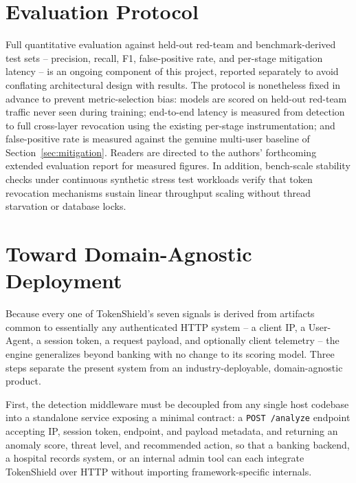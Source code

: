 \documentclass[conference]{IEEEtran}
\begin{document}
\section{Evaluation Protocol}
\label{sec:evaluation}
Full quantitative evaluation against held-out red-team and benchmark-derived test sets -- precision, recall, F1, false-positive rate, and per-stage mitigation latency -- is an ongoing component of this project, reported separately to avoid conflating architectural design with results. The protocol is nonetheless fixed in advance to prevent metric-selection bias: models are scored on held-out red-team traffic never seen during training; end-to-end latency is measured from detection to full cross-layer revocation using the existing per-stage instrumentation; and false-positive rate is measured against the genuine multi-user baseline of Section~\ref{sec:mitigation}. Readers are directed to the authors' forthcoming extended evaluation report for measured figures. In addition, bench-scale stability checks under continuous synthetic stress test workloads verify that token revocation mechanisms sustain linear throughput scaling without thread starvation or database locks.

\section{Toward Domain-Agnostic Deployment}
Because every one of TokenShield's seven signals is derived from artifacts common to essentially any authenticated HTTP system -- a client IP, a User-Agent, a session token, a request payload, and optionally client telemetry -- the engine generalizes beyond banking with no change to its scoring model. Three steps separate the present system from an industry-deployable, domain-agnostic product. 

First, the detection middleware must be decoupled from any single host codebase into a standalone service exposing a minimal contract: a \texttt{POST /analyze} endpoint accepting IP, session token, endpoint, and payload metadata, and returning an anomaly score, threat level, and recommended action, so that a banking backend, a hospital records system, or an internal admin tool can each integrate TokenShield over HTTP without importing framework-specific internals. 
\end{document}
